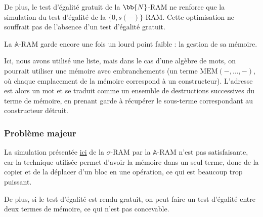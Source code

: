 \documentclass{report}
\newcommand{\bbA}{\mathbb{A}}
\begin{document}
				De plus, le test d'égalité gratuit de la $\bb{N}$-RAM ne renforce que la simulation du test d'égalité de la $\{0,s(-)\}$-RAM. Cette optimisation ne souffrait pas de l'absence d'un test d'égalité gratuit. 
				
				La $\bbA$-RAM garde encore une fois un lourd point faible : la gestion de sa mémoire.
				
				Ici, nous avons utilisé une liste, mais dans le cas d'une algèbre de mots, on pourrait utiliser une mémoire avec embranchements (un terme $\text{MEM}\left( -, \dots, -\right)$, où chaque emplacement de la mémoire correspond à un constructeur). L'adresse est alors un mot et se traduit comme un ensemble de destructions successives du terme de mémoire, en prenant garde à récupérer le sous-terme correspondant au constructeur détruit.				

			\subsubsection{Problème majeur}

				La simulation présentée \hyperref[par:sim_sigma_RAM_A_RAM]{ici} de la $\sigma$-RAM par la $\bbA$-RAM n'est pas satisfaisante, car la technique utilisée permet d'avoir la mémoire dans un seul terme, donc de la copier et de la déplacer d'un bloc en une opération, ce qui est beaucoup trop puissant. 
				
				De plus, si le test d'égalité est rendu gratuit, on peut faire un test d'égalité entre deux termes de mémoire, ce qui n'est pas concevable.






%		
%			
%			
			
			
	
			

	
			
	
	
			
\end{document}
